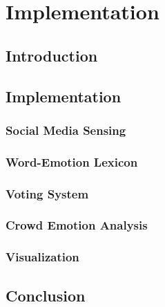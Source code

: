 \chapter{Implementation}

\ifpdf
    \graphicspath{{Chapter4/Figs/Raster/}{Chapter4/Figs/PDF/}{Chapter4/Figs/}}
\else
    \graphicspath{{Chapter4/Figs/Vector/}{Chapter4/Figs/}}
\fi

\section{Introduction}
\section{Implementation}
\subsection{Social Media Sensing}
\subsection{Word-Emotion Lexicon}
\subsection{Voting System}
\subsection{Crowd Emotion Analysis}
\subsection{Visualization}
\section{Conclusion}
